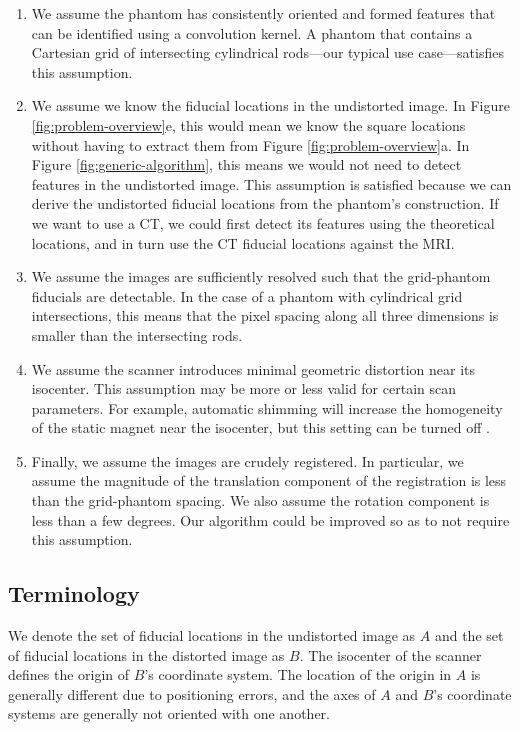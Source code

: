 \documentclass[12pt]{article}
\begin{document}
\begin{enumerate}
\item We assume the phantom has consistently oriented and formed features that can be identified using a convolution kernel.  A phantom that contains a Cartesian grid of intersecting cylindrical rods---our typical use case---satisfies this assumption.

\item We assume we know the fiducial locations in the undistorted image.  In Figure \ref{fig:problem-overview}e, this would mean we know the square locations without having to extract them from Figure \ref{fig:problem-overview}a.  In Figure \ref{fig:generic-algorithm}, this means we would not need to detect features in the undistorted image.  This assumption is satisfied because we can derive the undistorted fiducial locations from the phantom's construction.  If we want to use a CT, we could first detect its features using the theoretical locations, and in turn use the CT fiducial locations against the MRI.

\item We assume the images are sufficiently resolved such that the grid-phantom fiducials are detectable.  In the case of a phantom with cylindrical grid intersections, this means that the pixel spacing along all three dimensions is smaller than the intersecting rods.

\item We assume the scanner introduces minimal geometric distortion near its isocenter.  This assumption may be more or less valid for certain scan parameters.  For example, automatic shimming will increase the homogeneity of the static magnet near the isocenter, but this setting can be turned off \cite{baldwin2007}.

\item Finally, we assume the images are crudely registered.  In particular, we assume the magnitude of the translation component of the registration is less than the grid-phantom spacing.  We also assume the rotation component is less than a few degrees.  Our algorithm could be improved so as to not require this assumption.
\end{enumerate}

\subsection{Terminology}

We denote the set of fiducial locations in the undistorted image as $A$ and the set of fiducial locations in the distorted image as $B$.  The isocenter of the scanner defines the origin of $B$'s coordinate system.  The location of the origin in $A$ is generally different due to positioning errors, and the axes of $A$ and $B$'s coordinate systems are generally not oriented with one another.
\end{document}

